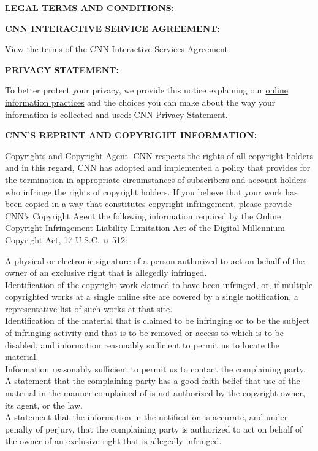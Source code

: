 \textbf{LEGAL TERMS AND CONDITIONS:}

\textbf{CNN INTERACTIVE SERVICE AGREEMENT:}

View the terms of the \href{http://www.cnn.com/terms}{CNN Interactive
Services Agreement.}

\textbf{PRIVACY STATEMENT:}

To better protect your privacy, we provide this notice explaining our
\href{privacy.html}{online information practices} and the choices you
can make about the way your information is collected and used:
\href{privacy.html}{CNN Privacy Statement.}

\textbf{CNN'S REPRINT AND COPYRIGHT INFORMATION:}

Copyrights and Copyright Agent. CNN respects the rights of all copyright
holders and in this regard, CNN has adopted and implemented a policy
that provides for the termination in appropriate circumstances of
subscribers and account holders who infringe the rights of copyright
holders. If you believe that your work has been copied in a way that
constitutes copyright infringement, please provide CNN's Copyright Agent
the following information required by the Online Copyright Infringement
Liability Limitation Act of the Digital Millennium Copyright Act, 17
U.S.C. ¤ 512:

A physical or electronic signature of a person authorized to act on
behalf of the owner of an exclusive right that is allegedly infringed.\\
Identification of the copyright work claimed to have been infringed, or,
if multiple copyrighted works at a single online site are covered by a
single notification, a representative list of such works at that site.\\
Identification of the material that is claimed to be infringing or to be
the subject of infringing activity and that is to be removed or access
to which is to be disabled, and information reasonably sufficient to
permit us to locate the material.\\
Information reasonably sufficient to permit us to contact the
complaining party.\\
A statement that the complaining party has a good-faith belief that use
of the material in the manner complained of is not authorized by the
copyright owner, its agent, or the law.\\
A statement that the information in the notification is accurate, and
under penalty of perjury, that the complaining party is authorized to
act on behalf of the owner of an exclusive right that is allegedly
infringed.


